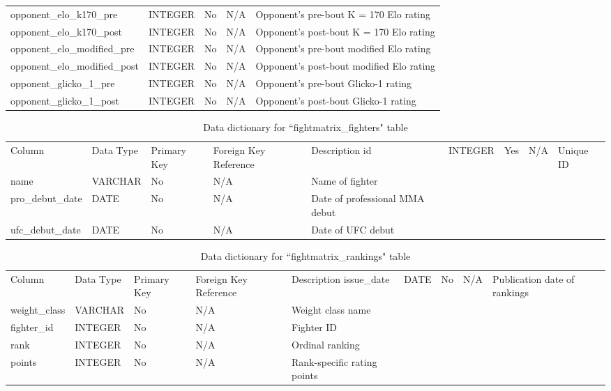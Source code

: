 \documentclass[12pt,twoside]{report}
\begin{document}
\begin{longtable}{lllll}
opponent\_elo\_k170\_pre      & INTEGER   & No          & N/A                    & Opponent's pre-bout K = 170 Elo rating    \\
opponent\_elo\_k170\_post     & INTEGER   & No          & N/A                    & Opponent's post-bout K = 170 Elo rating   \\
opponent\_elo\_modified\_pre  & INTEGER   & No          & N/A                    & Opponent's pre-bout modified Elo rating   \\
opponent\_elo\_modified\_post & INTEGER   & No          & N/A                    & Opponent's post-bout modified Elo rating  \\
opponent\_glicko\_1\_pre      & INTEGER   & No          & N/A                    & Opponent's pre-bout Glicko-1 rating       \\
opponent\_glicko\_1\_post     & INTEGER   & No          & N/A                    & Opponent's post-bout Glicko-1 rating      \\
\bottomrule
\end{longtable}
\normalsize

\tiny 
\begin{longtable}{lllll}
\caption{Data dictionary for ``fightmatrix\_fighters" table}\\ 
\toprule
Column           & Data Type & Primary Key & Foreign Key Reference & Description                     \endfirsthead 
\toprule
id               & INTEGER   & Yes         & N/A                   & Unique ID                       \\
name             & VARCHAR   & No          & N/A                   & Name of fighter                 \\
pro\_debut\_date & DATE      & No          & N/A                   & Date of professional MMA debut  \\
ufc\_debut\_date & DATE      & No          & N/A                   & Date of UFC debut               \\
\bottomrule
\end{longtable}
\normalsize

\tiny 
\begin{longtable}{lllll}
\caption{Data dictionary for ``fightmatrix\_rankings" table}\\ 
\toprule
Column        & Data Type & Primary Key & Foreign Key Reference & Description                   \endfirsthead 
\toprule
issue\_date   & DATE      & No          & N/A                   & Publication date of rankings  \\
weight\_class & VARCHAR   & No          & N/A                   & Weight class name             \\
fighter\_id   & INTEGER   & No          & N/A                   & Fighter ID                    \\
rank          & INTEGER   & No          & N/A                   & Ordinal ranking               \\
points        & INTEGER   & No          & N/A                   & Rank-specific rating points   \\
\bottomrule
\end{longtable}
\normalsize
\end{document}

